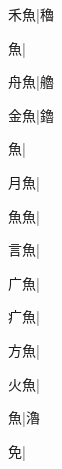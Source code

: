 \begin{multicols}{2}
{{\cjk{}{\cnsym{}　}禾魚}\mktsJzrVerticalBar{}{\cjk{}{\cnsym{}　}{\cnsym{}　}{\cnsym{}　}}|{\cjk{}穭}\par
{魚}\mktsJzrVerticalBar{}{\cjk{}{\cnsym{}　}{\cnsym{}　}{\cnsym{}　}}|{}\par
{\cjk{}{\cnsym{}　}舟魚}\mktsJzrVerticalBar{}{\cjk{}{\cnsym{}　}{\cnsym{}　}{\cnsym{}　}}|{\cjk{}艪}\par
{\cjk{}{\cnsym{}　}金魚}\mktsJzrVerticalBar{}{\cjk{}{\cnsym{}　}{\cnsym{}　}{\cnsym{}　}}|{\cjk{}鑥}\par
{魚}\mktsJzrVerticalBar{}{\cjk{}{\cnsym{}　}{\cnsym{}　}{\cnsym{}　}}|{}\par
{\cjk{}{\cnsym{}　}月魚}\mktsJzrVerticalBar{}{\cjk{}{\cnsym{}　}{\cnsym{}　}{\cnsym{}　}}|{}\par
{\cjk{}{\cnsym{}　}魚魚}\mktsJzrVerticalBar{}{\cjk{}{\cnsym{}　}{\cnsym{}　}{\cnsym{}　}}|{}\par
{\cjk{}{\cnsym{}　}言魚}\mktsJzrVerticalBar{}{\cjk{}{\cnsym{}　}{\cnsym{}　}{\cnsym{}　}}|{}\par
{\cjk{}{\cnsym{}　}广魚}\mktsJzrVerticalBar{}{\cjk{}{\cnsym{}　}{\cnsym{}　}{\cnsym{}　}}|{}\par
{\cjk{}{\cnsym{}　}疒魚}\mktsJzrVerticalBar{}{\cjk{}{\cnsym{}　}{\cnsym{}　}{\cnsym{}　}}|{}\par
{\cjk{}{\cnsym{}　}方魚}\mktsJzrVerticalBar{}{\cjk{}{\cnsym{}　}{\cnsym{}　}{\cnsym{}　}}|{}\par
{\cjk{}{\cnsym{}　}火魚}\mktsJzrVerticalBar{}{\cjk{}{\cnsym{}　}{\cnsym{}　}{\cnsym{}　}}|{}\par
{魚}\mktsJzrVerticalBar{}{\cjk{}{\cnsym{}　}{\cnsym{}　}{\cnsym{}　}}|{\cjk{}瀂}\par
{\cjk{}{\cnsym{}　}{\cnsym{}　}免}\mktsJzrVerticalBar{}{\cjk{}{\cnsym{}　}{\cnsym{}　}{\cnsym{}　}}|{}\par
}
\end{multicols}
